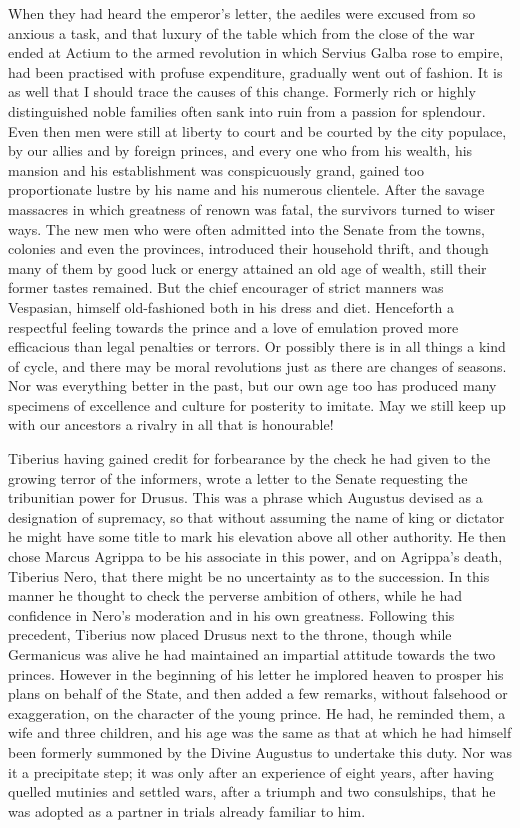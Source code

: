 
When they had heard the emperor's letter, the aediles were excused from so anxious a task, and that luxury of the table which from the close of the war ended at Actium to the armed revolution in which Servius Galba rose to empire, had been practised with profuse expenditure, gradually went out of fashion. It is as well that I should trace the causes of this change. Formerly rich or highly distinguished noble families often sank into ruin from a passion for splendour. Even then men were still at liberty to court and be courted by the city populace, by our allies and by foreign princes, and every one who from his wealth, his mansion and his establishment was conspicuously grand, gained too proportionate lustre by his name and his numerous clientele. After the savage massacres in which greatness of renown was fatal, the survivors turned to wiser ways. The new men who were often admitted into the Senate from the towns, colonies and even the provinces, introduced their household thrift, and though many of them by good luck or energy attained an old age of wealth, still their former tastes remained. But the chief encourager of strict manners was Vespasian, himself old-fashioned both in his dress and diet. Henceforth a respectful feeling towards the prince and a love of emulation proved more efficacious than legal penalties or terrors. Or possibly there is in all things a kind of cycle, and there may be moral revolutions just as there are changes of seasons. Nor was everything better in the past, but our own age too has produced many specimens of excellence and culture for posterity to imitate. May we still keep up with our ancestors a rivalry in all that is honourable!


Tiberius having gained credit for forbearance by the check he had given to the growing terror of the informers, wrote a letter to the Senate requesting the tribunitian power for Drusus. This was a phrase which Augustus devised as a designation of supremacy, so that without assuming the name of king or dictator he might have some title to mark his elevation above all other authority. He then chose Marcus Agrippa to be his associate in this power, and on Agrippa's death, Tiberius Nero, that there might be no uncertainty as to the succession. In this manner he thought to check the perverse ambition of others, while he had confidence in Nero's moderation and in his own greatness. Following this precedent, Tiberius now placed Drusus next to the throne, though while Germanicus was alive he had maintained an impartial attitude towards the two princes. However in the beginning of his letter he implored heaven to prosper his plans on behalf of the State, and then added a few remarks, without falsehood or exaggeration, on the character of the young prince. He had, he reminded them, a wife and three children, and his age was the same as that at which he had himself been formerly summoned by the Divine Augustus to undertake this duty. Nor was it a precipitate step; it was only after an experience of eight years, after having quelled mutinies and settled wars, after a triumph and two consulships, that he was adopted as a partner in trials already familiar to him.

